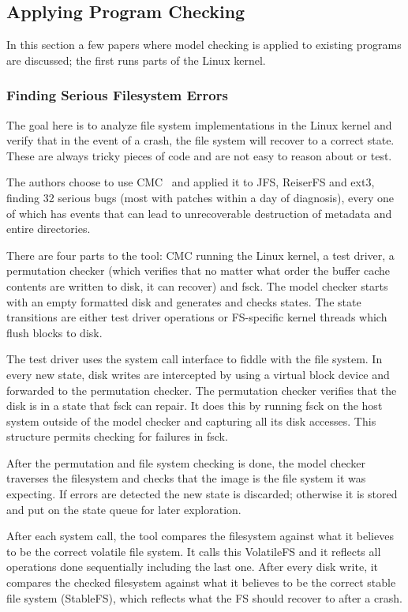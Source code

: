 \documentclass{article}
\begin{document}
\begin{multicols}{2}
\subsection{Applying Program Checking}

In this section a few papers where model checking is applied to
existing programs are discussed; the first runs parts of the Linux
kernel.

\subsubsection{Finding Serious Filesystem Errors~\cite{yang04using}}

The goal here is to analyze file system implementations in the Linux
kernel and verify that in the event of a crash, the file system will
recover to a correct state.  These are always tricky pieces of code
and are not easy to reason about or test.

The authors choose to use CMC~\cite{musuvathi:osdi:cmc} and applied it
to JFS, ReiserFS and ext3, finding 32 serious bugs (most with patches
within a day of diagnosis), every one of which has events that can
lead to unrecoverable destruction of metadata and entire directories.

There are four parts to the tool: CMC running the Linux kernel, a test
driver, a permutation checker (which verifies that no matter what
order the buffer cache contents are written to disk, it can recover)
and fsck.  The model checker starts with an empty formatted disk and
generates and checks states.  The state transitions are either test
driver operations or FS-specific kernel threads which flush blocks to
disk.

The test driver uses the system call interface to fiddle with the file
system.  In every new state, disk writes are intercepted by using a
virtual block device and forwarded to the permutation checker.  The
permutation checker verifies that the disk is in a state that fsck can
repair.  It does this by running fsck on the host system outside of
the model checker and capturing all its disk accesses.  This structure
permits checking for failures in fsck.

After the permutation and file system checking is done, the model
checker traverses the filesystem and checks that the image is the file
system it was expecting.  If errors are detected the new state is
discarded; otherwise it is stored and put on the state queue for
later exploration.

After each system call, the tool compares the filesystem against what
it believes to be the correct volatile file system.  It calls this
VolatileFS and it reflects all operations done sequentially including
the last one.  After every disk write, it compares the checked
filesystem against what it believes to be the correct stable file
system (StableFS), which reflects what the FS should recover to after
a crash.


\end{multicols}
\end{document}
